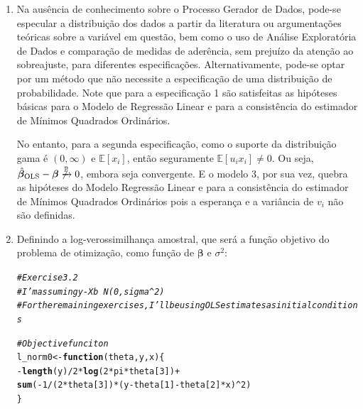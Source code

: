 \documentclass{homework}\usepackage[]{graphicx}\usepackage[]{color}
\makeatletter
\newcommand{\hlnum}[1]{\textcolor[rgb]{0.686,0.059,0.569}{#1}}%
\newcommand{\hlcom}[1]{\textcolor[rgb]{0.678,0.584,0.686}{\textit{#1}}}%
\newcommand{\hlopt}[1]{\textcolor[rgb]{0,0,0}{#1}}%
\newcommand{\hlstd}[1]{\textcolor[rgb]{0.345,0.345,0.345}{#1}}%
\newcommand{\hlkwa}[1]{\textcolor[rgb]{0.161,0.373,0.58}{\textbf{#1}}}%
\newcommand{\hlkwb}[1]{\textcolor[rgb]{0.69,0.353,0.396}{#1}}%
\newcommand{\hlkwc}[1]{\textcolor[rgb]{0.333,0.667,0.333}{#1}}%
\newcommand{\hlkwd}[1]{\textcolor[rgb]{0.737,0.353,0.396}{\textbf{#1}}}%
\newenvironment{kframe}{%
 \def\at@end@of@kframe{}%
 \ifinner\ifhmode%
  \def\at@end@of@kframe{\end{minipage}}%
  \begin{minipage}{\columnwidth}%
 \fi\fi%
 \def\FrameCommand##1{\hskip\@totalleftmargin \hskip-\fboxsep
 \colorbox{shadecolor}{##1}\hskip-\fboxsep
     \hskip-\linewidth \hskip-\@totalleftmargin \hskip\columnwidth}%
 \MakeFramed {\advance\hsize-\width
   \@totalleftmargin\z@ \linewidth\hsize
   \@setminipage}}%
 {\par\unskip\endMakeFramed%
 \at@end@of@kframe}
\newenvironment{knitrout}{}{} %
\makeatother
\begin{document}
\begin{enumerate}

\item Na ausência de conhecimento sobre o Processo Gerador de Dados, pode-se especular a distribuição dos dados a partir da literatura ou argumentações teóricas sobre a variável em questão, bem como o uso de Análise Exploratória de Dados e comparação de medidas de aderência, sem prejuízo da atenção ao sobreajuste, para diferentes especificações. Alternativamente, pode-se optar por um método que não necessite a especificação de uma distribuição de probabilidade. Note que para a especificação 1 são satisfeitas as hipóteses básicas para o Modelo de Regressão Linear e para a consistência do estimador de Mínimos Quadrados Ordinários.

No entanto, para a segunda especificação, como o suporte da distribuição gama é $\left(0,\infty\right)$ e $\mathbb{E}[x_i]$, então seguramente $\mathbb{E}[u_ix_i] \neq 0$. Ou seja, $\hat{\bm{\beta}}_{\mathrm{OLS}} - \bm{\beta} \not\xrightarrow{\mathbb{P}} 0$, embora seja convergente. E o modelo 3, por sua vez, quebra as hipóteses do Modelo Regressão Linear e para a consistência do estimador de Mínimos Quadrados Ordinários pois a esperança e a variância de $v_i$ não são definidas.

\item Definindo a log-verossimilhança amostral, que será a função objetivo do problema de otimização, como função de $\bm{\beta}$ e $\sigma^2$:

\begin{knitrout}
\color{fgcolor}\begin{kframe}
\begin{alltt}
\hlcom{# Exercise 3.2}
\hlcom{# I'm assuming y - Xb ~ N(0, sigma^2)}
\hlcom{# For the remaining exercises, I'll be using OLS estimates as initial conditions}

\hlcom{# Objective funciton}
\hlstd{l_norm0} \hlkwb{<-} \hlkwa{function}\hlstd{(}\hlkwc{theta}\hlstd{,} \hlkwc{y}\hlstd{,} \hlkwc{x}\hlstd{)\{}
  \hlopt{-}\hlkwd{length}\hlstd{(y)}\hlopt{/}\hlnum{2}\hlopt{*}\hlkwd{log}\hlstd{(}\hlnum{2}\hlopt{*}\hlstd{pi}\hlopt{*}\hlstd{theta[}\hlnum{3}\hlstd{])} \hlopt{+}
    \hlkwd{sum}\hlstd{(}\hlopt{-}\hlnum{1}\hlopt{/}\hlstd{(}\hlnum{2}\hlopt{*}\hlstd{theta[}\hlnum{3}\hlstd{])}\hlopt{*}\hlstd{(y} \hlopt{-} \hlstd{theta[}\hlnum{1}\hlstd{]} \hlopt{-} \hlstd{theta[}\hlnum{2}\hlstd{]}\hlopt{*}\hlstd{x)}\hlopt{^}\hlnum{2}\hlstd{)}
\hlstd{\}}
\end{alltt}
\end{kframe}
\end{knitrout}


\end{enumerate}
\end{document}

